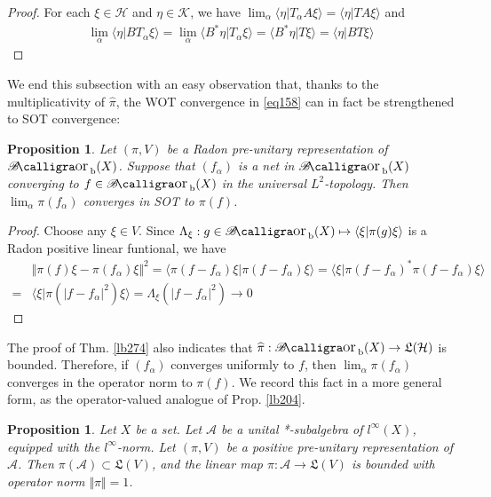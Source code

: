 \documentclass[12pt,b5paper,notitlepage]{article}
\theoremstyle{definition}
\theoremstyle{plain}
\newtheorem{pp}[df]{Proposition}
\DeclareMathOperator{\Borb}{{\mathscr{B}\text{\kern -2pt {\calligra\large or}}\,}_{\mathrm b}}
\newcommand{\fk}{\mathfrak}
\newcommand{\wht}{\widehat}
\newcommand{\bk}[1]{\langle {#1}\rangle}
\newcommand{\scr}{\mathscr}
\newcommand{\MH}{\mathcal H}
\newcommand{\MK}{\mathcal K}
\newcommand{\SA}{\mathscr A}
\numberwithin{equation}{section}
\begin{document}
\begin{proof}
For each $\xi\in\MH$ and $\eta\in\MK$, we have $\lim_\alpha\bk{\eta|T_\alpha A\xi}=\bk{\eta|TA\xi}$ and
\begin{align*}
\lim_\alpha\bk{\eta|BT_\alpha\xi}=\lim_\alpha\bk{B^*\eta|T_\alpha\xi}=\bk{B^*\eta|T\xi}=\bk{\eta|BT\xi}
\end{align*}
\end{proof}


We end this subsection with an easy observation that, thanks to the multiplicativity of $\wht\pi$, the WOT convergence in \eqref{eq158} can in fact be strengthened to SOT convergence:


\begin{pp}\label{lb293}
Let $(\pi,V)$ be a Radon pre-unitary representation of $\Borb(X)$. Suppose that $(f_\alpha)$ is a net in $\Borb(X)$ converging to $f\in\Borb(X)$ in the universal $L^2$-topology. Then $\lim_\alpha\pi(f_\alpha)$ converges in SOT to $\pi(f)$.
\end{pp}

\begin{proof}
Choose any $\xi\in V$. Since $\Lambda_\xi:g\in\Borb(X)\mapsto\bk{\xi|\pi(g)\xi}$ is a Radon positive linear funtional, we have
\begin{align*}
&\Vert \pi(f)\xi-\pi(f_\alpha)\xi\Vert^2=\bk{\pi(f-f_\alpha)\xi|\pi(f-f_\alpha)\xi}=\bk{\xi|\pi(f-f_\alpha)^*\pi(f-f_\alpha)\xi}\\
=&\bk{\xi|\pi(|f-f_\alpha|^2)\xi}=\Lambda_\xi(|f-f_\alpha|^2)\rightarrow0
\end{align*}
\end{proof}


The proof of Thm. \ref{lb274} also indicates that $\wht\pi:\Borb(X)\rightarrow\fk L(\MH)$ is bounded. Therefore, if $(f_\alpha)$ converges uniformly to $f$, then $\lim_\alpha\pi(f_\alpha)$ converges in the operator norm to $\pi(f)$. We record this fact in a more general form, as the operator-valued analogue of Prop. \ref{lb204}.

\begin{pp}\label{lb294}
Let $X$ be a set. Let $\scr A$ be a unital *-subalgebra of $l^\infty(X)$, equipped with the $l^\infty$-norm. Let $(\pi,V)$ be a positive pre-unitary representation of $\scr A$. Then $\pi(\SA)\subset\fk L(V)$, and the linear map $\pi:\SA\rightarrow\fk L(V)$ is bounded with operator norm $\Vert\pi\Vert=1$.
\end{pp}
\end{document}
